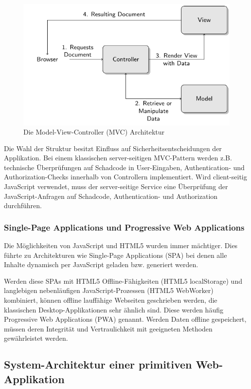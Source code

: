 \begin{figure}[h!]
	\includegraphics[width=\textwidth]{graphs/mvc.pdf}
	\centering
	\caption{Die Model-View-Controller (MVC) Architektur}
\end{figure}

Die Wahl der Struktur besitzt Einfluss auf Sicherheitsentscheidungen der Applikation. Bei einem klassischen server-seitigen MVC-Pattern werden z.B. technische Überprüfungen auf Schadcode in User-Eingaben, Authentication- und Authorization-Checks innerhalb von Controllern implementiert. Wird client-seitig JavaScript verwendet, muss der server-seitige Service eine Überprüfung der JavaScript-Anfragen auf Schadcode, Authentication- und Authorization durchführen.

\subsubsection{Single-Page Applications und Progressive Web Applications}

Die Möglichkeiten von JavaScript und HTML5 wurden immer mächtiger. Dies führte zu Architekturen wie Single-Page Applications (SPA) bei denen alle Inhalte dynamisch per JavaScript geladen bzw. generiert werden.

Werden diese SPAs mit HTML5 Offline-Fähigkeiten (HTML5 localStorage) und langlebigen nebenläufigen JavaScript-Prozessen (HTML5 WebWorker) kombiniert, können offline lauffähige Webseiten geschrieben werden, die klassischen Desktop-Applikationen  sehr ähnlich sind. Diese werden häufig Progressive Web Applications (PWA) genannt. Werden Daten offline gespeichert, müssen deren Integrität und Vertraulichkeit mit geeigneten Methoden gewährleistet werden.

\subsection{System-Architektur einer primitiven Web-Applikation}

